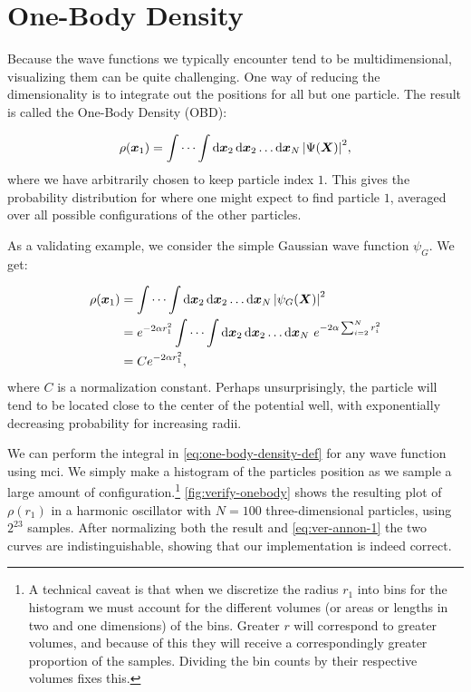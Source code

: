 \documentclass[Thesis.tex]{subfiles}
\begin{document}
\section{One-Body Density}

Because the wave functions we typically encounter tend to be multidimensional,
visualizing them can be quite challenging. One way of reducing the
dimensionality is to integrate out the positions for all but one particle. The
result is called the One-Body Density (OBD):

\begin{align}
  \label{eq:one-body-density-def}
  \rho(\bm{x}_1) = \idotsint \dd{\bm{x}_2}\dd{\bm{x}_2}\dots\dd{\bm{x}_N} \abs{\Psi(\bm{X})}^2,
\end{align}
where we have arbitrarily chosen to keep particle index $1$. This gives the
probability distribution for where one might expect to find particle $1$,
averaged over all possible configurations of the other particles.

As a validating example, we consider the simple Gaussian wave function $\psi_G$.
We get:

\begin{align}
  \rho(\bm{x}_1) &= \idotsint \dd{\bm{x}_2}\dd{\bm{x}_2}\dots\dd{\bm{x}_N} \abs{\psi_G(\bm{X})}^2\\
  &= e^{-2\alpha r_1^2}\idotsint \dd{\bm{x}_2}\dd{\bm{x}_2}\dots\dd{\bm{x}_N} \,e^{-2\alpha\sum_{i=2}^N r_i^2}\\
    &= C e^{-2\alpha r_1^2},\label{eq:ver-annon-1}
\end{align}
where $C$ is a normalization constant. Perhaps unsurprisingly, the particle will
tend to be located close to the center of the potential well, with exponentially
decreasing probability for increasing radii.

We can perform the integral in \cref{eq:one-body-density-def} for any wave
function using \gls{mci}. We simply make a histogram of the
particles position as we sample a large amount of configuration.\footnote{A
technical caveat is that when we discretize the radius $r_1$ into bins for the
histogram we must account for the different volumes (or areas or lengths in two
and one dimensions) of the bins. Greater $r$ will correspond to greater volumes,
and because of this they will receive a correspondingly greater proportion of
the samples. Dividing the bin counts by their respective volumes fixes this.}
\cref{fig:verify-onebody} shows the resulting plot of $\rho(r_1)$ in a harmonic
oscillator with $N=100$ three-dimensional particles, using $2^{23}$
samples. After normalizing both the result and \cref{eq:ver-annon-1} the two
curves are indistinguishable, showing that our implementation is indeed correct.
\end{document}
